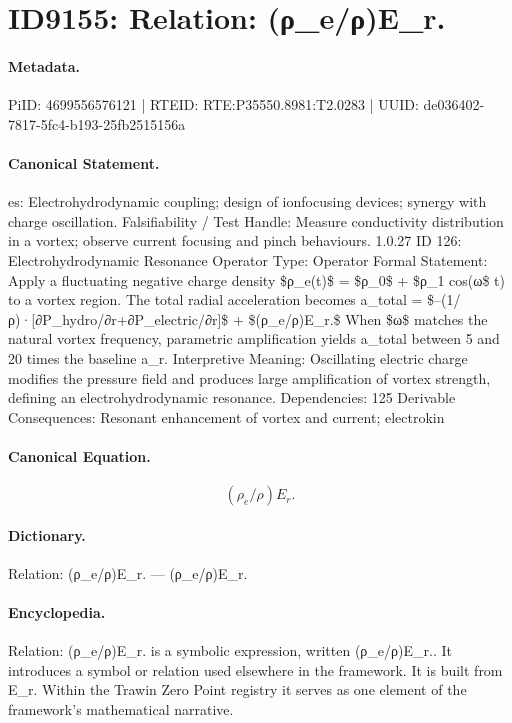 \section*{ID9155: Relation: (ρ\_e/ρ)E\_r.}
\paragraph{Metadata.}
PiID: 4699556576121 | RTEID: RTE:P35550.8981:T2.0283 | UUID: de036402-7817-5fc4-b193-25fb2515156a

\paragraph{Canonical Statement.}
es: Electrohydrodynamic coupling; design of ionfocusing devices; synergy with charge oscillation. Falsifiability / Test Handle: Measure conductivity distribution in a vortex; observe current focusing and pinch behaviours. 1.0.27 ID 126: Electrohydrodynamic Resonance Operator Type: Operator Formal Statement: Apply a fluctuating negative charge density \$ρ\_e(t)\$ = \$ρ\_0\$ + \$ρ\_1 cos(ω\$ t) to a vortex region. The total radial acceleration becomes a\_total = \$–(1/ρ)·[∂P\_hydro/∂r+∂P\_electric/∂r]\$ + \$(ρ\_e/ρ)E\_r.\$ When \$ω\$ matches the natural vortex frequency, parametric amplification yields a\_total between 5 and 20 times the baseline a\_r. Interpretive Meaning: Oscillating electric charge modifies the pressure field and produces large amplification of vortex strength, defining an electrohydrodynamic resonance. Dependencies: 125 Derivable Consequences: Resonant enhancement of vortex and current; electrokin

\paragraph{Canonical Equation.}
\[
(ρ_e/ρ)E_r.
\]

\paragraph{Dictionary.}
Relation: (ρ\_e/ρ)E\_r. — (ρ\_e/ρ)E\_r.

\paragraph{Encyclopedia.}
Relation: (ρ\_e/ρ)E\_r. is a symbolic expression, written (ρ\_e/ρ)E\_r.. It introduces a symbol or relation used elsewhere in the framework. It is built from E\_r. Within the Trawin Zero Point registry it serves as one element of the framework's mathematical narrative.
